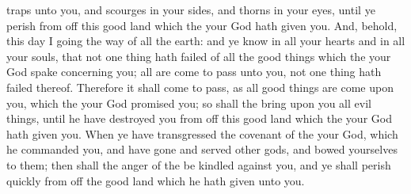 {traps unto you, and
scourges in your
sides, and
thorns in your
eyes, until ye
perish from off this
good
land which the
{} your
God hath
given you.
And, behold, this
day I
{}
going the
way of all the
earth: and ye
know in all your
hearts and in all your
souls, that not
one
thing hath
failed of all the
good
things which the
{} your
God
spake concerning you; all are come to
pass unto you,
{} not
one
thing hath
failed thereof.
Therefore it shall come to pass,
{} as all
good
things are
come upon you, which the
{} your
God
promised you; so shall the
{}
bring upon you all
evil
things, until he have
destroyed you from off this
good
land which the
{} your
God hath
given you.
When ye have
transgressed the
covenant of the
{} your
God, which he
commanded you, and have
gone and
served
other
gods, and
bowed yourselves to them; then shall the
anger of the
{} be
kindled against you, and ye shall
perish
quickly from off the
good
land which he hath
given unto you.

}

